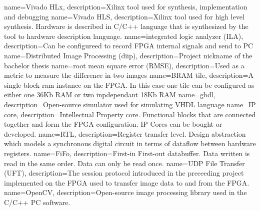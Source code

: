 %
%
{
    name=Vivado HLx,
    description={Xilinx tool used for synthesis, implementation and debugging}
}
{
    name=Vivado HLS,
    description={Xilinx tool used for high level synthesis. Hardware is
    described in C/C++ language that is synthesized by the tool to hardware
    description language.}
}
{
    name=integrated logic analyzer (ILA),
    description={Can be configureed to record FPGA internal signals and send to PC}
}
{
    name=Distributed Image Processing (diip),
    description={Project nickname of the bachelor thesis}
}
{
    name=root mean square error (RMSE),
    description={Used as a metric to measure the difference in two images}
}
{
    name=BRAM tile,
    description={A single block ram instance on the FPGA. In this case one tile
    can be configured as either one 36Kb RAM or two inpdependant 18Kb RAM}
}
{
    name=ghdl,
    description={Open-source simulator used for simulating VHDL language}
}
{
    name=IP core,
    description={Intellectual Property core. Functional blocks that are
    connected together and form the FPGA configuration. IP Cores can be bought
    or developed.}
}
{
    name=RTL,
    description={Register transfer level. Design abstraction which models a
    synchronous digital circuit in terms of dataflow between hardware
    registers.}
}
{
    name=FiFo,
    description={First-in First-out databuffer. Data written is read in the
    same order. Data can only be read once.}
}
{
    name=UDP File Transfer (UFT),
    description={The session protocol introduced in the preceeding project
    implemented on
    the FPGA used to transfer image data to and from the FPGA.}
}
{
    name=OpenCV,
    description={Open-source image processing library used in the C/C++ PC
    software.}
}